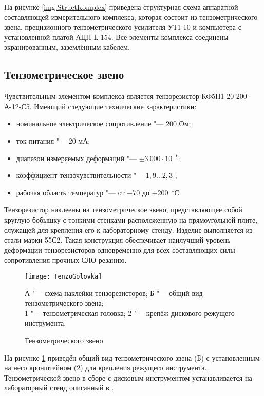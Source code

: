На рисунке \ref{img:StructKomplex} приведена структурная схема аппаратной составляющей измерительного комплекса, которая состоит из тензометрического звена, прецизионного тензометрического усилителя УТ1-10 и компьютера с установленной платой АЦП L-154. Все элементы комплекса соединены экранированным, заземлённым кабелем.

\subsection{Тензометрическое звено}\label{subsect2_4_1}

Чувствительным элементом комплекса является тензорезистор КФ5П1-20-200-А-12-С5. Имеющий следующие технические характеристики: 
\begin{itemize}
	\item номинальное электрическое сопротивление "--- $200$ Ом;
	\item ток питания "--- $20$ мА;
	\item диапазон измеряемых деформаций "--- $\pm3~000\cdot10^{-6}$;
	\item коэффициент тензочувствительности "--- $1,9\ldots2,3$ ;
	\item рабочая область температур "--- от $-$70 до $+$200~${}^\circ$С.
\end{itemize}

Тензорезистор наклеены на тензометрическое звено, представляющее собой круглую бобышку с тонкими стенками расположенную на прямоугольной плите, служащей для крепления его к лабораторному стенду. Изделие выполняется из стали марки 55С2. Такая конструкция обеспечивает наилучший уровень деформации тензорезисторов одновременно для всех составляющих силы сопротивления прочных СЛО резанию.

\begin{figure} [htbp]
	\center
	\texttt{[image: TenzoGolovka]}
	
	А "--- схема наклейки тензорезисторов; Б "--- общий вид тензометрического звена;\\
	1 "--- тензометрическая головка; 2 "--- крепёж дискового режущего инструмента.
	\caption{Тензометрического звено} 
	\label{img:TenzoGolovka}  
\end{figure}

На рисунке \ref{img:TenzoGolovka} приведён общий вид тензометрического звена (Б) с установленным на него кронштейном (2) для крепления режущего инструмента. Тензометрической звено в сборе с дисковым инструментом устанавливается на лабораторный стенд описанный в \todo{[ссылки]}.


